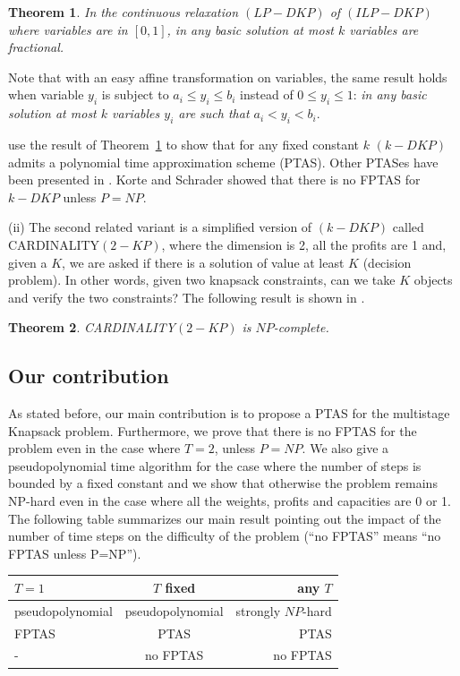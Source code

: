 \documentclass[a4paper]{book}
\newtheorem{theorem}{Theorem}[chapter]
\begin{document}
\begin{theorem}\cite{Carpara}\label{th:kdkp}
In the continuous relaxation $(LP-DKP)$ of $(ILP-DKP)$ where variables are in $[0,1]$, in any basic solution at most $k$ variables are fractional.
\end{theorem} 

Note that with an easy affine transformation on variables, the same result holds when variable $y_i$ is subject to $a_i\leq y_i\leq b_i$ instead of $0\leq y_i\leq 1$: {\it in any basic solution at most $k$ variables $y_i$ are such that $a_i<y_i<b_i$}.

\cite{Carpara} use the result of Theorem~\ref{th:kdkp} to show that for any fixed constant $k$ $(k-DKP)$ admits a polynomial time approximation scheme (PTAS). Other PTASes
have been presented in  \cite{Oguz, Frieze}.  Korte and Schrader 
\cite{Korte} showed that there is no FPTAS for $k-DKP$ unless $P=NP$. 

(ii) The second related variant is a simplified version of $(k-DKP)$ called
CARDINALITY$(2-KP)$, where the dimension is 2, all the profits are 1 and, given a $K$, we are asked if there is a solution of value at least $K$ (decision problem). In other words, given two knapsack constraints, can we take $K$ objects and verify the two constraints? The following result is shown in \cite{Kelerrer}. 

\begin{theorem}\cite{Kelerrer}\label{th:dimkp}
CARDINALITY$(2-KP)$ is $NP$-complete.
\end{theorem}



\subsection{Our contribution}
As stated before, our main contribution is to propose a PTAS for the {\sc multistage  Knapsack} problem. Furthermore, we prove that there is no  FPTAS for the problem even in the case where $T=2$, unless $P=NP$. We also give a pseudopolynomial time algorithm for the case where the number of steps is bounded by a fixed constant and we show that otherwise the problem remains NP-hard even in the case where all the weights, profits and capacities are 0 or 1. The following table summarizes our main result pointing out the impact of the number of time steps on the difficulty of the problem (``no FPTAS'' means ``no FPTAS unless P=NP'').

\begin{center}
\begin{tabular}{|l|c|r|}
  \hline
  $T=1$ & $T$ fixed &any $T$  \\
  \hline
  pseudopolynomial & pseudopolynomial & strongly $NP$-hard \\
    \hline
  FPTAS & PTAS & PTAS \\
   - & no FPTAS & no FPTAS \\
  \hline
\end{tabular}
\end{center}
\end{document}
